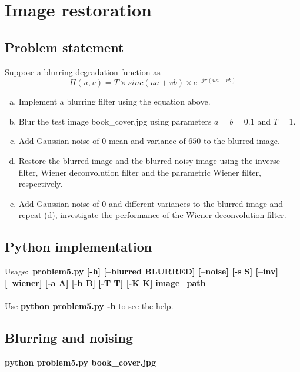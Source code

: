 \chapter{Image restoration}

\section{Problem statement}

Suppose a blurring degradation function as
\begin{equation}
    H(u, v) = T \times sinc(ua + vb) \times e^{-j\pi(ua + vb)}
\end{equation}
\bigskip
\begin{enumerate}[(a)]
    \item Implement a blurring filter using the equation above.
    \item Blur the test image book\_cover.jpg using parameters $a = b = 0.1$ and $T = 1$.
    \item Add Gaussian noise of $0$ mean and variance of $650$ to the blurred image.
    \item Restore the blurred image and the blurred noisy image using the inverse filter,
          Wiener deconvolution filter and the parametric Wiener filter, respectively.
      \item Add Gaussian noise of $0$ and different variances to the blurred image and repeat (d),
          investigate the performance of the Wiener deconvolution filter.
\end{enumerate}

\section{Python implementation}

Usage:~\textbf{problem5.py [-h] [--blurred BLURRED] [--noise] [-s S] [--inv]} \\
\textbf{[--wiener] [-a A] [-b B] [-T T] [-K K]}
\textbf{image\_path} \\\\
Use \textbf{python problem5.py -h} to see the help.

\pagebreak
\section{Blurring and noising}

\textbf{python problem5.py book\_cover.jpg}

